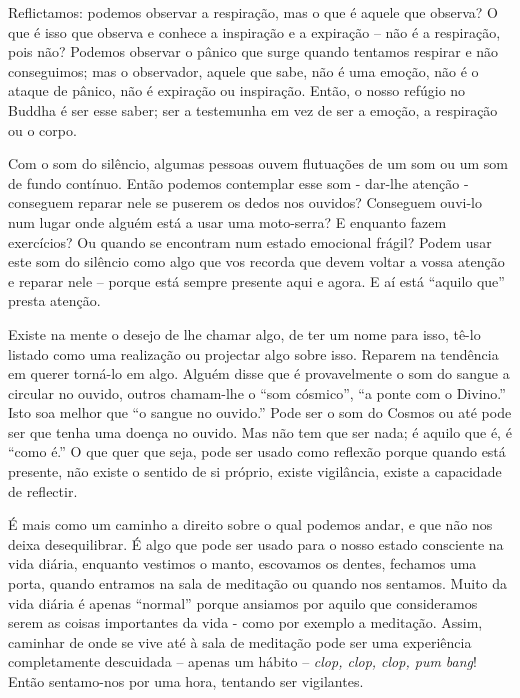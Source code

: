 Reflictamos: podemos observar a respiração, mas o que é aquele que
observa? O que é isso que observa e conhece a inspiração e a expiração
-- não é a respiração, pois não? Podemos observar o pânico que surge
quando tentamos respirar e não conseguimos; mas o observador, aquele que
sabe, não é uma emoção, não é o ataque de pânico, não é expiração ou
inspiração. Então, o nosso refúgio no Buddha é ser esse saber; ser a
testemunha em vez de ser a emoção, a respiração ou o corpo.

Com o som do silêncio, algumas pessoas ouvem flutuações de um som ou um
som de fundo contínuo. Então podemos contemplar esse som - dar-lhe
atenção - conseguem reparar nele se puserem os dedos nos ouvidos?
Conseguem ouvi-lo num lugar onde alguém está a usar uma moto-serra? E
enquanto fazem exercícios? Ou quando se encontram num estado emocional
frágil? Podem usar este som do silêncio como algo que vos recorda que
devem voltar a vossa atenção e reparar nele -- porque está sempre
presente aqui e agora. E aí está ``aquilo que'' presta atenção.

Existe na mente o desejo de lhe chamar algo, de ter um nome para isso,
tê-lo listado como uma realização ou projectar algo sobre isso. Reparem
na tendência em querer torná-lo em algo. Alguém disse que é
provavelmente o som do sangue a circular no ouvido, outros chamam-lhe o
``som cósmico'', ``a ponte com o Divino.'' Isto soa melhor que ``o
sangue no ouvido.'' Pode ser o som do Cosmos ou até pode ser que tenha
uma doença no ouvido. Mas não tem que ser nada; é aquilo que é, é ``como
é.'' O que quer que seja, pode ser usado como reflexão porque quando
está presente, não existe o sentido de si próprio, existe vigilância,
existe a capacidade de reflectir.  

É mais como um caminho a direito sobre o qual podemos andar, e que não
nos deixa desequilibrar.  É algo que pode ser usado para o nosso estado
consciente na vida diária, enquanto vestimos o manto, escovamos os
dentes, fechamos uma porta, quando entramos na sala de meditação ou
quando nos sentamos. Muito da vida diária é apenas ``normal'' porque
ansiamos por aquilo que consideramos serem as coisas importantes da vida
- como por exemplo a meditação. Assim, caminhar de onde se vive até à
sala de meditação pode ser uma experiência completamente descuidada --
apenas um hábito -- \emph{clop, clop, clop, pum bang}! Então sentamo-nos
por uma hora, tentando ser vigilantes.

